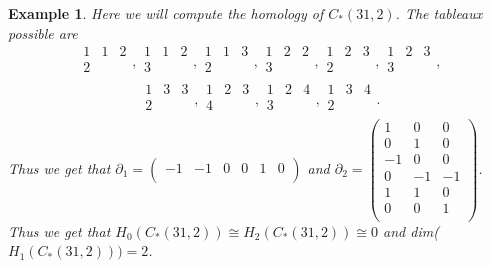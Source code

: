 \documentclass{elsart}
\newtheorem{example}[theorem]{Example}
\begin{document}
\begin{example}
  Here we will compute the homology of $C_*(31,2)$.
  The tableaux possible are
         $$\begin{array}{ccc} 1 & 1 & 2 \\ 2&&\\ \end{array}, \begin{array}{ccc} 1 & 1 & 2 \\ 3&&\\ \end{array},
           \begin{array}{ccc} 1 & 1 & 3 \\ 2&&\\ \end{array}, \begin{array}{ccc} 1 & 2 & 2 \\ 3&&\\ \end{array},
           \begin{array}{ccc} 1 & 2 & 3 \\ 2&&\\ \end{array}, \begin{array}{ccc} 1 & 2 & 3 \\ 3&&\\ \end{array},$$
         $$\begin{array}{ccc} 1 & 3 & 3 \\ 2&&\\ \end{array}, \begin{array}{ccc} 1 & 2 & 3 \\ 4&&\\ \end{array},
           \begin{array}{ccc} 1 & 2 & 4 \\ 3&&\\ \end{array}, \begin{array}{ccc} 1 & 3 & 4 \\ 2&&\\ \end{array}.$$
         Thus we get that $\partial_1 = \left( \begin{array}{cccccc}-1 & -1 & 0 & 0 & 1 & 0 \\ 
         \end{array} \right) $ and $\partial_2 = \left(\begin{array}{ccc} 1 & 0 & 0\\ 0 & 1 & 0 \\ -1 & 0 & 0 \\ 0 & -1 & -1\\
         1 & 1 & 0\\ 0 & 0 & 1\\ \end{array} \right) $. Thus we get that $H_0(C_*(31,2)) \cong H_2(C_*(31,2)) \cong 0$ and 
         dim($H_1(C_*(31,2))) = 2$.

\end{example}
\end{document}
